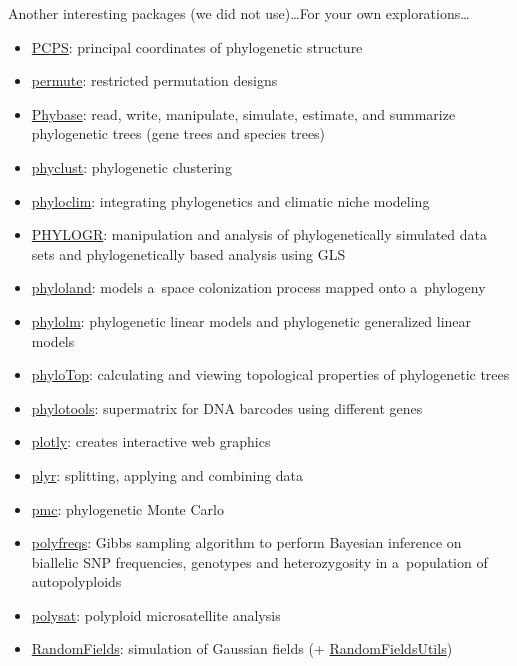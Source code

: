 \documentclass[compress, ucs, xelatex, 11pt, xcolor=svgnames, aspectratio=169,
	hyperref={
		bookmarks=true,
		unicode=true,
		colorlinks=true,
		pdftitle={Molecular data in R},
		plainpages=false,
		pdfauthor={Vojtech Zeisek},
		pdfsubject={Course about phylogeny and evolution in R},
		pdfcreator={XeLaTeX},
		pdfkeywords={R, evolution, phylogeny, molecular data},
		linkcolor=Crimson, %
		anchorcolor=Magenta, %
		citecolor=Magenta, %
		filecolor=Magenta, %
		menucolor=Magenta, %
		urlcolor=DodgerBlue, %
		pdftex},
	url={hyphens, lowtilde} %
	]{beamer}
\begin{document}
\begin{frame}[allowframebreaks]{Another interesting packages (we did not use)\ldots}{For your own explorations\ldots}
\begin{itemize}
		\item \href{https://CRAN.R-project.org/package=PCPS}{PCPS}: principal coordinates of phylogenetic structure
		\item \href{https://CRAN.R-project.org/package=permute}{permute}: restricted permutation designs
		\item \href{https://github.com/lliu1871/phybase}{Phybase}: read, write, manipulate, simulate, estimate, and summarize phylogenetic trees (gene trees and species trees)
		\item \href{https://CRAN.R-project.org/package=phyclust}{phyclust}: phylogenetic clustering
		\item \href{https://CRAN.R-project.org/package=phyloclim}{phyloclim}: integrating phylogenetics and climatic niche modeling
		\item \href{https://CRAN.R-project.org/package=PHYLOGR}{PHYLOGR}: manipulation and analysis of phylogenetically simulated data sets and phylogenetically based analysis using GLS
		\item \href{https://CRAN.R-project.org/package=phyloland}{phyloland}: models a~space colonization process mapped onto a~phylogeny
		\item \href{https://CRAN.R-project.org/package=phylolm}{phylolm}: phylogenetic linear models and phylogenetic generalized linear models
		\item \href{https://CRAN.R-project.org/package=phyloTop}{phyloTop}: calculating and viewing topological properties of phylogenetic trees
		\item \href{https://CRAN.R-project.org/package=phylotools}{phylotools}: supermatrix for DNA barcodes using different genes
		\item \href{https://CRAN.R-project.org/package=plotly}{plotly}: creates interactive web graphics
		\item \href{https://CRAN.R-project.org/package=plyr}{plyr}: splitting, applying and combining data
		\item \href{https://CRAN.R-project.org/package=pmc}{pmc}: phylogenetic Monte Carlo
		\item \href{https://CRAN.R-project.org/package=polyfreqs}{polyfreqs}: Gibbs sampling algorithm to perform Bayesian inference on biallelic SNP frequencies, genotypes and heterozygosity in a~population of autopolyploids
		\item \href{https://CRAN.R-project.org/package=polysat}{polysat}: polyploid microsatellite analysis
		\item \href{https://CRAN.R-project.org/package=RandomFields}{RandomFields}: simulation of Gaussian fields (+ \href{https://CRAN.R-project.org/package=RandomFieldsUtils}{RandomFieldsUtils})

\end{itemize}
\end{frame}
\end{document}

